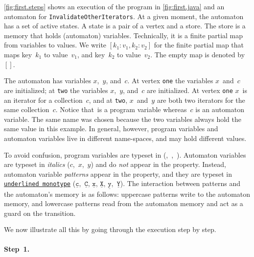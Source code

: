 \documentclass[9pt, preprint]{sigplanconf} %
\newcommand{\pattern}[1]{\ensuremath{\mathtt{\underline{#1}}}}
\theoremstyle{definition}
\theoremstyle{remark}
\begin{document}
\autoref{fig:first.steps} shows an execution of the program in \autoref{fig:first.java} and an automaton for \texttt{InvalidateOtherIterators}.
At a given moment, the automaton has a set of active states.
A state is a pair of a vertex and a store.
The store is a memory that holds (automaton) variables.
Technically, it is a finite partial map from variables to values.
We write $[k_1:v_1,k_2:v_2]$ for the finite partial map that maps key~$k_1$ to value~$v_1$, and key~$k_2$ to value~$v_2$.
The empty map is denoted by~$[]$.

The automaton has variables $x$,~$y$, and~$c$.
At vertex \texttt{one} the variables $x$~and~$c$ are initialized;
at \texttt{two} the variables $x$,~$y$, and~$c$ are initialized.
At vertex \texttt{one} $x$~is an iterator for a collection~$c$, and
at \texttt{two}, $x$~and~$y$ are both two iterators for the same collection~$c$.
Notice that~\Verb@c@ is a program variable whereas~$c$ is an automaton variable.
The same name was chosen because the two variables always hold the same value in this example.
In general, however, program variables and automaton variables live in different name-spaces, and may hold different values.

To avoid confusion, program variables are typeset in \Verb@monotype@ (\Verb@c@,~\Verb@i@,~\Verb@j@).
Automaton variables are typeset in \textit{italics} ($c$,~$x$,~$y$) and do \emph{not} appear in the property.
Instead, automaton variable \emph{patterns} appear in the property, and they are typeset in \texttt{\underline{underlined monotype}} (\pattern c,~\pattern C, \pattern x, \pattern X, \pattern y,~\pattern Y).
The interaction between patterns and the automaton's memory is as follows: uppercase patterns write to the automaton memory, and lowercase patterns read from the automaton memory and act as a guard on the transition.

We now illustrate all this by going through the execution step by
step.

\paragraph{Step~1.}
\end{document}

